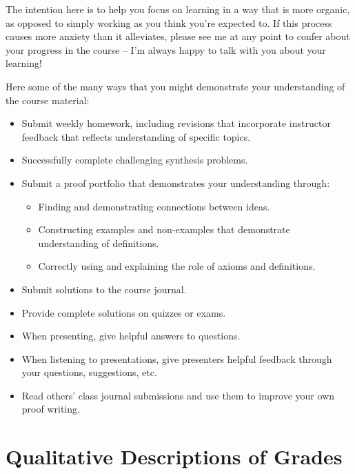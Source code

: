 \documentclass[
  letterpaper,
  DIV=11,
  numbers=noendperiod]{scrreprt}
\providecommand{\tightlist}{%
  \setlength{\itemsep}{0pt}\setlength{\parskip}{0pt}}\usepackage{longtable,booktabs,array}
\begin{document}
The intention here is to help you focus on learning in a way that is
more organic, as opposed to simply working as you think you're expected
to. If this process causes more anxiety than it alleviates, please see
me at any point to confer about your progress in the course -- I'm
always happy to talk with you about your learning!

Here some of the many ways that you might demonstrate your understanding
of the course material:

\begin{itemize}
\tightlist
\item
  Submit weekly homework, including revisions that incorporate
  instructor feedback that reflects understanding of specific topics.
\item
  Successfully complete challenging synthesis problems.
\item
  Submit a proof portfolio that demonstrates your understanding through:

  \begin{itemize}
  \tightlist
  \item
    Finding and demonstrating connections between ideas.
  \item
    Constructing examples and non-examples that demonstrate
    understanding of definitions.
  \item
    Correctly using and explaining the role of axioms and definitions.
  \end{itemize}
\item
  Submit solutions to the course journal.
\item
  Provide complete solutions on quizzes or exams.
\item
  When presenting, give helpful answers to questions.
\item
  When listening to presentations, give presenters helpful feedback
  through your questions, suggestions, etc.
\item
  Read others' class journal submissions and use them to improve your
  own proof writing.
\end{itemize}

\section*{Qualitative Descriptions of
Grades}\label{qualitative-descriptions-of-grades}

\end{document}
